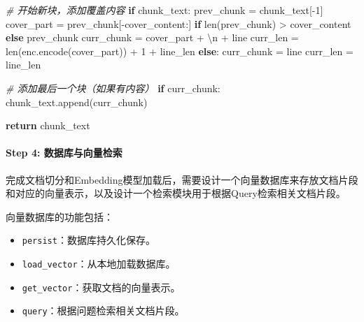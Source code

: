 \documentclass[
]{article}
\newenvironment{Shaded}{}{}
\newcommand{\BuiltInTok}[1]{\textcolor[rgb]{0.00,0.50,0.00}{#1}}
\newcommand{\CharTok}[1]{\textcolor[rgb]{0.25,0.44,0.63}{#1}}
\newcommand{\CommentTok}[1]{\textcolor[rgb]{0.38,0.63,0.69}{\textit{#1}}}
\newcommand{\ControlFlowTok}[1]{\textcolor[rgb]{0.00,0.44,0.13}{\textbf{#1}}}
\newcommand{\DecValTok}[1]{\textcolor[rgb]{0.25,0.63,0.44}{#1}}
\newcommand{\NormalTok}[1]{#1}
\newcommand{\OperatorTok}[1]{\textcolor[rgb]{0.40,0.40,0.40}{#1}}
\newcommand{\StringTok}[1]{\textcolor[rgb]{0.25,0.44,0.63}{#1}}
\providecommand{\tightlist}{%
  \setlength{\itemsep}{0pt}\setlength{\parskip}{0pt}}
\begin{document}
\begin{Shaded}
\begin{Highlighting}[]
            \CommentTok{\# 开始新块，添加覆盖内容}
            \ControlFlowTok{if}\NormalTok{ chunk\_text:}
\NormalTok{                prev\_chunk }\OperatorTok{=}\NormalTok{ chunk\_text[}\OperatorTok{{-}}\DecValTok{1}\NormalTok{]}
\NormalTok{                cover\_part }\OperatorTok{=}\NormalTok{ prev\_chunk[}\OperatorTok{{-}}\NormalTok{cover\_content:] }\ControlFlowTok{if} \BuiltInTok{len}\NormalTok{(prev\_chunk) }\OperatorTok{\textgreater{}}\NormalTok{ cover\_content }\ControlFlowTok{else}\NormalTok{ prev\_chunk}
\NormalTok{                curr\_chunk }\OperatorTok{=}\NormalTok{ cover\_part }\OperatorTok{+} \StringTok{\textquotesingle{}}\CharTok{\textbackslash{}n}\StringTok{\textquotesingle{}} \OperatorTok{+}\NormalTok{ line}
\NormalTok{                curr\_len }\OperatorTok{=} \BuiltInTok{len}\NormalTok{(enc.encode(cover\_part)) }\OperatorTok{+} \DecValTok{1} \OperatorTok{+}\NormalTok{ line\_len}
            \ControlFlowTok{else}\NormalTok{:}
\NormalTok{                curr\_chunk }\OperatorTok{=}\NormalTok{ line}
\NormalTok{                curr\_len }\OperatorTok{=}\NormalTok{ line\_len}

    \CommentTok{\# 添加最后一个块（如果有内容）}
    \ControlFlowTok{if}\NormalTok{ curr\_chunk:}
\NormalTok{        chunk\_text.append(curr\_chunk)}

    \ControlFlowTok{return}\NormalTok{ chunk\_text}
\end{Highlighting}
\end{Shaded}

\paragraph{Step 4:
数据库与向量检索}\label{step-4-ux6570ux636eux5e93ux4e0eux5411ux91cfux68c0ux7d22}

完成文档切分和Embedding模型加载后，需要设计一个向量数据库来存放文档片段和对应的向量表示，以及设计一个检索模块用于根据Query检索相关文档片段。

向量数据库的功能包括：

\begin{itemize}
\tightlist
\item
  \texttt{persist}：数据库持久化保存。
\item
  \texttt{load\_vector}：从本地加载数据库。
\item
  \texttt{get\_vector}：获取文档的向量表示。
\item
  \texttt{query}：根据问题检索相关文档片段。
\end{itemize}
\end{document}

